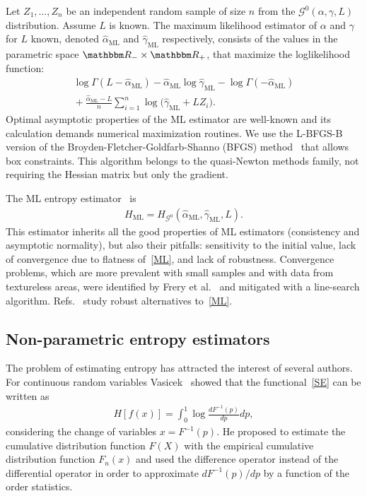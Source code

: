 \documentclass[journal]{IEEEtran}
\begin{document}
Let $Z_1,\dots, Z_n$ be an independent random sample of size $n$ from the $\mathcal G^0(\alpha,\gamma,L)$ distribution.
Assume $L$ is known.
The maximum likelihood estimator of $\alpha$ and $\gamma$ for $L$ known, denoted $\widehat\alpha_{\text{ML}}$ and $\widehat\gamma_{\text{ML}}$ respectively, consists of the values in the parametric space $\mathbbm R_-\times\mathbbm R_+$, that maximize the loglikelihood function:
\begin{multline}
	\log \Gamma(L-\widehat\alpha_{\text{ML}})-
	\widehat\alpha_{\text{ML}}\log \widehat\gamma_{\text{ML}} -\log\Gamma(-\widehat\alpha_{\text{ML}})  \\
	\mbox{}+\frac{\widehat\alpha_{\text{ML}}-L}{n} \sum_{i=1}^n\log\big(\widehat\gamma_{\text{ML}}+L Z_i\big).
	\label{ML}
\end{multline}
Optimal asymptotic properties of the ML estimator are well-known and its calculation demands numerical maximization routines.
We use the L-BFGS-B version of the Broyden-Fletcher-Goldfarb-Shanno (BFGS) method~\cite{Luenberger2008} that allows box constraints.
This algorithm belongs to the quasi-Newton methods family, not requiring the Hessian matrix but only the gradient.

The ML entropy estimator~\cite{CaseBerg01} is
\begin{align}
	H_\text{ML}=H_{\mathcal G^0}(\widehat{\alpha}_{\text{ML}},\widehat{\gamma}_{\text{ML}},L).
\end{align}
This estimator inherits all the good properties of ML estimators (consistency and asymptotic normality), but also their pitfalls: sensitivity to the initial value, lack of convergence due to flatness of~\eqref{ML}, and lack of robustness.
Convergence problems, which are more prevalent with small samples and with data from textureless areas, were identified by Frery et al.~\cite{FreryCribariSouza:JASP:04} and mitigated with a line-search algorithm.
Refs.~\cite{BustosFreryLucini:Mestimators:2001,AllendeFreryetal:JSCS:05,gambini2015} study robust alternatives to~\eqref{ML}.

\subsection{Non-parametric entropy estimators}
\label{Hest}

The problem of estimating entropy has attracted the interest of several authors. 
For continuous random variables Vasicek~\cite{Vasicek76} showed that the functional~\eqref{SE} can be written as
\begin{align}
	H[f(x)]=\int_{0}^{1} \log \frac{d F^{-1}(p)}{d p} d p,
\end{align}
considering the change of variables $x=F^{-1}(p).$
He proposed to estimate the cumulative distribution function  $F(X)$ with the empirical cumulative distribution function $F_n(x)$ and used the difference operator instead of the differential operator in order to approximate ${d F^{-1}(p)}/{d p}$ by a function of the order statistics.
\end{document}
